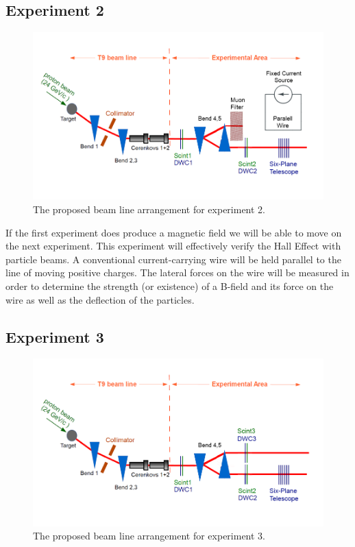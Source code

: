 \documentclass[12pt,letterpaper]{article}
\begin{document}
\subsection{Experiment 2}
\begin{figure}[H]
\label{experiment_setup2}
  \centering
\includegraphics[]{experimental_setup2.png}
 \caption{The proposed beam line arrangement for experiment 2.}
\end{figure}
If the first experiment does produce a magnetic field we will be able to move on the next experiment.
This experiment will effectively verify the Hall Effect with particle beams. 
A conventional current-carrying wire will be held parallel to the line of moving positive charges. The lateral forces on the wire will be measured in order to determine the strength (or existence) of a B-field and its force on the wire as well as the deflection of the particles.

\subsection{Experiment 3}
\begin{figure}[H]
\label{experiment_setup3}
  \centering
\includegraphics[]{experimental_setup3.png}
 \caption{The proposed beam line arrangement for experiment 3.}
\end{figure}
\end{document}
